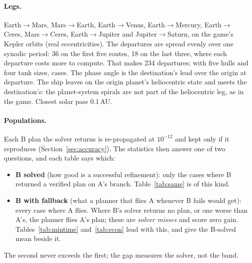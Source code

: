 \documentclass[10pt,a4paper]{article}
\begin{document}
\paragraph{Legs.} Earth$\to$Mars, Mars$\to$Earth, Earth$\to$Venus, Earth$\to$Mercury, Earth$\to$Ceres,
Mars$\to$Ceres, Earth$\to$Jupiter and Jupiter$\to$Saturn, on the game's Kepler orbits (real eccentricities). The
departures are spread evenly over one synodic period: 36 on the first five routes, 18 on the last three, where each
departure costs more to compute. That makes 234 departures; with five hulls and four tank sizes, \nAll{} cases. The phase angle is the destination's lead over the origin at departure.
The ship leaves on the origin planet's heliocentric state and meets the destination's: the planet-system spirals
are not part of the heliocentric leg, as in the game. Closest solar pass 0.1\,AU.

\paragraph{Populations.}
\label{sec:populations}
Each B plan the solver returns is re-propagated at $10^{-12}$ and kept only if it reproduces
(Section~\ref{sec:accuracy}). The statistics then answer one of two questions, and each table says which:
\begin{itemize}
\item \textbf{B solved} (how good is a successful refinement): only the cases where B returned a verified plan
  on A's branch. Table~\ref{tab:same} is of this kind.
\item \textbf{B with fallback} (what a planner that flies A whenever B fails would get): every case where A flies.
  Where B's solver returns no plan, or one worse than A's, the planner flies A's plan; these are \emph{solver
  misses} and score zero gain. Tables~\ref{tab:mintime} and~\ref{tab:econ} lead with this, and give the
  B-solved mean beside it.
\end{itemize}
The second never exceeds the first; the gap measures the solver, not the band.
\end{document}
